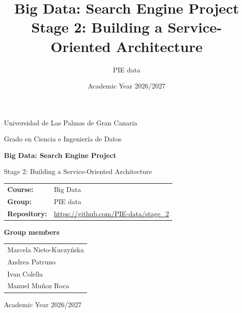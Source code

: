 \documentclass[12pt,a4paper]{article}
\title{Big Data: Search Engine Project\\Stage 2: Building a Service-Oriented Architecture}
\author{PIE data}
\date{Academic Year 2026/2027}
\begin{document}

\begin{titlepage}
    \centering
    \vspace*{1.5cm}

    {\Large Universidad de Las Palmas de Gran Canaria\par}
    \vspace{0.3cm}
    {\large Grado en Ciencia e Ingeniería de Datos\par}

    \vspace{1.5cm}

    {\Huge\bfseries Big Data: Search Engine Project\par}
    \vspace{0.45cm}
    {\LARGE Stage 2: Building a Service-Oriented Architecture\par}

    \vspace{1.6cm}

    \begin{tabular}{ll}
        \textbf{Course:} & Big Data \\
        \textbf{Group:} & PIE data \\
        \textbf{Repository:} & \url{https://github.com/PIE-data/stage_2} \\
    \end{tabular}

    \vspace{1.6cm}

    {\large\bfseries Group members\par}
    \vspace{0.45cm}

    \begin{tabular}{l}
        Marcela Nieto-Kuczyńska \\
        Andrea Patruno \\
        Ivan Colella \\
        Manuel Muñoz Roca \\
    \end{tabular}

    \vfill
    {\large Academic Year 2026/2027\par}
\end{titlepage}

\clearpage
{}
\tableofcontents
\clearpage
{}
\end{document}
